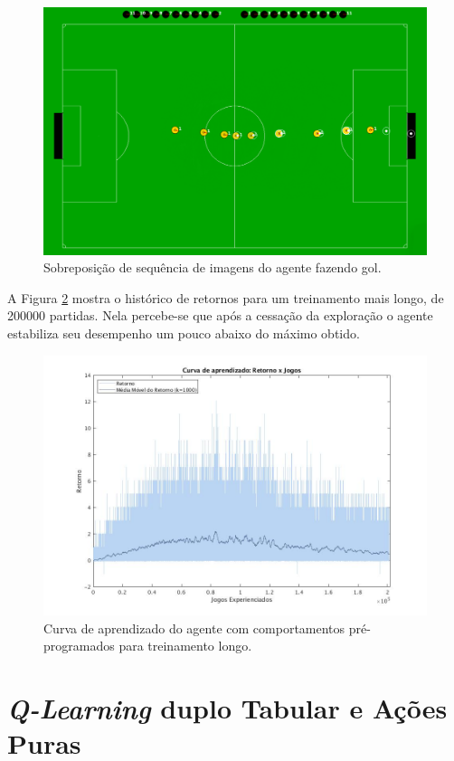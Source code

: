 \begin{figure}[H]
	\includegraphics[width=0.9\linewidth]{figs/goal-sequence.png}
	\centering
	\caption{Sobreposição de sequência de imagens do agente fazendo gol.}
	\label{fig:goal-seq}
\end{figure}

A Figura \ref{fig:curvalonga-bhv} mostra o histórico de retornos para um treinamento mais longo, de 200000 partidas. Nela percebe-se que após a cessação da exploração o agente estabiliza seu desempenho um pouco abaixo do máximo obtido.

\begin{figure}[H]
	\includegraphics[width=0.9\linewidth]{figs/curvalonga-behaviors-tabular.jpg}
	\centering
	\caption{Curva de aprendizado do agente com comportamentos pré-programados para treinamento longo.}
	\label{fig:curvalonga-bhv}
\end{figure}

\section{\textit{Q-Learning} duplo Tabular e Ações Puras}


